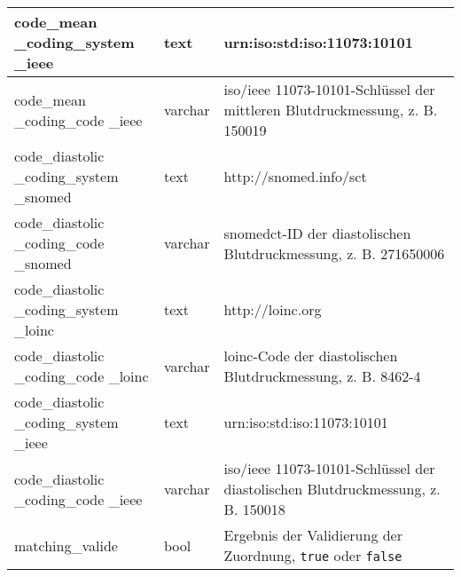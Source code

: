 \begin{longtable}{|p{3.5cm}|l|p{6.5cm}|}
		code\_mean \_coding\_system \_ieee & text & urn:iso:std:iso:11073:10101 \\ \hline
		code\_mean \_coding\_code \_ieee & varchar & \ac{iso}/\ac{ieee} 11073-10101\texttrademark{}-Schlüssel der mittleren Blutdruckmessung, z. B. 150019 \\ \hline
		code\_diastolic \_coding\_system \_snomed & text & http://snomed.info/sct \\ \hline
		code\_diastolic \_coding\_code \_snomed & varchar & \ac{snomedct}-ID der diastolischen Blutdruckmessung, z. B. 271650006 \\ \hline
		code\_diastolic \_coding\_system \_loinc & text & http://loinc.org \\ \hline
		code\_diastolic \_coding\_code \_loinc & varchar & \ac{loinc}-Code der diastolischen Blutdruckmessung, z. B. 8462-4 \\ \hline
		code\_diastolic \_coding\_system \_ieee & text & urn:iso:std:iso:11073:10101 \\ \hline
		code\_diastolic \_coding\_code \_ieee & varchar & \ac{iso}/\ac{ieee} 11073-10101\texttrademark{}-Schlüssel der diastolischen Blutdruckmessung, z. B. 150018 \\ \hline
		matching\_valide & bool & Ergebnis der Validierung der Zuordnung, \texttt{true} oder \texttt{false} \\ \hline
\end{longtable}
